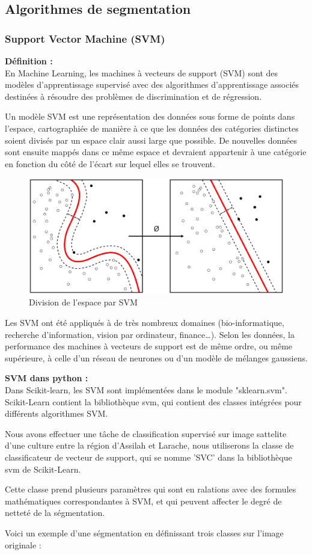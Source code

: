 \documentclass[12pt, openany]{report}
\begin{document}
\subsection{Algorithmes de segmentation}

\subsubsection{Support Vector Machine (SVM)}

\textbf{Définition :}\\
En Machine Learning, les machines à vecteurs de support (SVM) sont des modèles d'apprentissage supervisé avec des algorithmes d'apprentissage associés destinées à résoudre des problèmes de discrimination et de régression. 
\par
Un modèle SVM est une représentation des données sous forme de points dans l'espace, cartographiée de manière à ce que les données des catégories distinctes soient divisés par un espace clair aussi large que possible. De nouvelles données sont ensuite mappés dans ce même espace et devraient appartenir à une catégorie en fonction du côté de l'écart sur lequel elles se trouvent.
\begin{figure}[H]
\centering
\includegraphics[scale=0.2]{svm.png}
\caption{Division de l'espace par SVM}
\end{figure}

\par
Les SVM ont été appliqués à de très nombreux domaines (bio-informatique, recherche d'information, vision par ordinateur, finance…). Selon les données, la performance des machines à vecteurs de support est de même ordre, ou même supérieure, à celle d'un réseau de neurones ou d'un modèle de mélanges gaussiens.

\textbf{SVM dans python :} \\
Dans Scikit-learn, les SVM sont implémentées dans le module "sklearn.svm".
Scikit-Learn contient la bibliothèque svm, qui contient des classes intégrées pour différents algorithmes SVM. 
\par
Nous avons effectuer une tâche de classification supervisé sur image sattelite d'une culture entre la région d'Assilah et Larache, nous utiliserons la classe de classificateur de vecteur de support, qui se nomme 'SVC' dans la bibliothèque svm de Scikit-Learn.
\par
Cette classe prend plusieurs paramètres qui sont en ralations avec des formules mathématiques correspondantes à SVM, et qui peuvent affecter le degré de netteté de la ségmentation.
\par
Voici un exemple d'une ségmentation en définissant trois classes sur l'image originale : 
\end{document}
